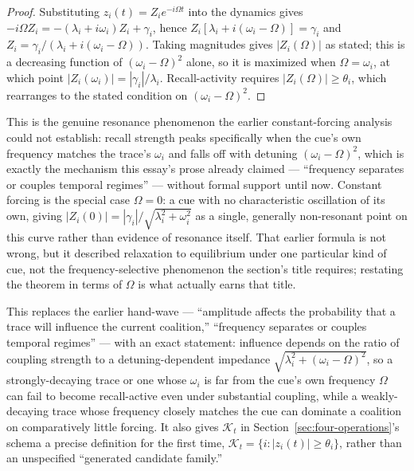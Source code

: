 \documentclass[11pt]{article}
\begin{document}
\begin{proof}
Substituting $z_i(t)=Z_i e^{-i\Omega t}$ into the dynamics gives $-i\Omega Z_i = -(\lambda_i+i\omega_i)Z_i + \gamma_i$, hence $Z_i[\lambda_i+i(\omega_i-\Omega)]=\gamma_i$ and $Z_i=\gamma_i/(\lambda_i+i(\omega_i-\Omega))$. Taking magnitudes gives $|Z_i(\Omega)|$ as stated; this is a decreasing function of $(\omega_i-\Omega)^2$ alone, so it is maximized when $\Omega=\omega_i$, at which point $|Z_i(\omega_i)|=|\gamma_i|/\lambda_i$. Recall-activity requires $|Z_i(\Omega)|\geq\theta_i$, which rearranges to the stated condition on $(\omega_i-\Omega)^2$.
\end{proof}

This is the genuine resonance phenomenon the earlier constant-forcing analysis could not establish: recall strength peaks specifically when the cue's own frequency matches the trace's $\omega_i$ and falls off with detuning $(\omega_i-\Omega)^2$, which is exactly the mechanism this essay's prose already claimed --- ``frequency separates or couples temporal regimes'' --- without formal support until now. Constant forcing is the special case $\Omega=0$: a cue with no characteristic oscillation of its own, giving $|Z_i(0)|=|\gamma_i|/\sqrt{\lambda_i^2+\omega_i^2}$ as a single, generally non-resonant point on this curve rather than evidence of resonance itself. That earlier formula is not wrong, but it described relaxation to equilibrium under one particular kind of cue, not the frequency-selective phenomenon the section's title requires; restating the theorem in terms of $\Omega$ is what actually earns that title.

This replaces the earlier hand-wave --- ``amplitude affects the probability that a trace will influence the current coalition,'' ``frequency separates or couples temporal regimes'' --- with an exact statement: influence depends on the ratio of coupling strength to a detuning-dependent impedance $\sqrt{\lambda_i^2+(\omega_i-\Omega)^2}$, so a strongly-decaying trace or one whose $\omega_i$ is far from the cue's own frequency $\Omega$ can fail to become recall-active even under substantial coupling, while a weakly-decaying trace whose frequency closely matches the cue can dominate a coalition on comparatively little forcing. It also gives $\mathcal{K}_t$ in Section~\ref{sec:four-operations}'s schema a precise definition for the first time, $\mathcal{K}_t=\{i:|z_i(t)|\geq\theta_i\}$, rather than an unspecified ``generated candidate family.''
\end{document}
